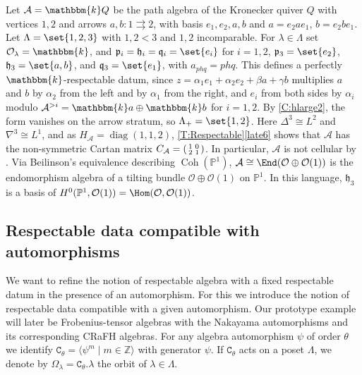 \documentclass[a4paper,11pt]{amsart}
\numberwithin{equation}{subsection}
\theoremstyle{definition}
\theoremstyle{theorem}
\theoremstyle{remark}
\newcommand\CO{\mathcal{O}}
\newcommand\plam[1][\lambda]{\mathfrak{p}_{#1}}
\newcommand\hlam[1][\lambda]{\mathfrak{h}_{#1}}
\newcommand\qlam[1][\lambda]{\mathfrak{q}_{#1}}
\newcommand\Olam[1][\lambda]{\CO_{#1}}
\newcommand\op{\operatorname}
\newcommand\kk{\mathbbm{k}}
\newcommand\Z{\mathbb{Z}}
\begin{document}
\begin{Example}\label{Ex:Kronecker}
  Let $\mathcal{A}=\kk Q$ be the path algebra of the Kronecker quiver $Q$ with vertices $1,2$
  and arrows $a,b\colon1\rightrightarrows 2$, with basis $e_1,e_2,a,b$ and $a=e_2ae_1$, $b=e_2be_1$. Let
  $\Lambda=\set{1,2,3}$ with $1,2<3$ and $1,2$ incomparable. For $\lambda\in\Lambda$ set $\Olam=\kk$, and
  $\plam[i]=\hlam[i]=\qlam[i]=\set{e_i}$ for $i=1,2$,
  $\plam[3]=\set{e_2}$, $\hlam[3]=\set{a,b}$, and $\qlam[3]=\set{e_1}$,
  with $a_{phq}=phq$. This defines a perfectly $\kk$-respectable datum, since
  $z=\alpha_1e_1+\alpha_2e_2+\beta a+\gamma b$ multiplies $a$ and $b$ by
  $\alpha_2$ from the left and by $\alpha_1$ from the right, and $e_i$ from both sides by $\alpha_i$ modulo $\mathcal{A}^{>i}=\kk a\oplus\kk b$ for $i=1,2$.
  By \autoref{C:hlarge2}, the form vanishes on the arrow stratum, so $\Lambda_+=\set{1,2}$.
  Here $\Delta^3\cong L^2$ and $\nabla^3\cong L^1$, and as $H_{\mathcal{A}}=\op{diag}(1,1,2)$,
  \autoref{T:Respectable}\autoref{late6} shows that $\mathcal{A}$ has the
  non-symmetric Cartan matrix
  $C_{\mathcal{A}}=\begin{psmallmatrix}1&0\\2&1\end{psmallmatrix}$. In
  particular, $\mathcal{A}$ is not cellular by
  \cite[Theorem~3.7]{GrahamLehrer:Cellular}. Via Beilinson's equivalence \cite{Beilinson:CoherentSheaves} describing $\op{Coh}(\mathbb P^1)$,
  $\mathcal{A}\cong\End(\CO\oplus\CO(1))$ is the endomorphism algebra of a tilting bundle $\CO\oplus\CO(1)$ on $\mathbb P^1$. In
  this language, $\hlam[3]$ is a basis of $H^0(\mathbb P^1,\CO(1))=\Hom(\CO,\CO(1))$.
\end{Example}

\subsection{Respectable data compatible with automorphisms}
We want to refine the notion of respectable algebra with a fixed respectable datum in the presence of an automorphism. For this we introduce the notion of
 respectable data compatible with a given automorphism. Our prototype example will later be Frobenius-tensor algebras with the Nakayama automorphisms
 and its  corresponding CRaFH algebras. For any algebra automorphism $\psi$ of order $\theta$ we identify $\mathtt{C}_\theta=\langle \psi^m\mid m\in\Z\rangle$ with generator $\psi$. If $\mathtt{C}_\theta$ acts on a poset $\Lambda$, we denote by $\Omega_\lambda=\mathtt{C}_\theta.\lambda$ the orbit of $\lambda\in\Lambda$.
\end{document}
